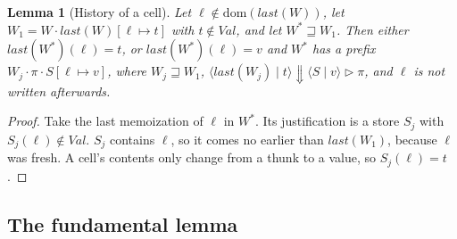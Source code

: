 \documentclass[11pt]{article}
\newtheorem*{lemma}{Lemma}
\newcommand{\last}[1]{\mathit{last}(#1)}
\newcommand{\ext}{\sqsupseteq}
\newcommand{\cfg}[2]{\langle #1 \mid #2 \rangle}
\newcommand{\evals}[5]{\cfg{#1}{#2} \Downarrow \cfg{#3}{#4} \mathrel{\triangleright} #5}
\newcommand{\Val}{\mathit{Val}}
\begin{document}
\begin{lemma}[History of a cell]
  Let $\ell \notin \mathrm{dom}(\last{W})$, let $W_1 = W \cdot
  \last{W}[\ell \mapsto t]$ with $t \notin \Val$, and let $W^* \ext W_1$. Then
  either $\last{W^*}(\ell) = t$, or $\last{W^*}(\ell) = v$ and $W^*$ has a
  prefix $W_j \cdot \pi \cdot S[\ell \mapsto v]$, where $W_j \ext W_1$,
  $\evals{\last{W_j}}{t}{S}{v}{\pi}$, and $\ell$ is not written afterwards.
\end{lemma}
\begin{proof}
  Take the last memoization of $\ell$ in $W^*$. Its justification is a store
  $S_j$ with $S_j(\ell) \notin \Val$. $S_j$ contains $\ell$, so it comes no
  earlier than $\last{W_1}$, because $\ell$ was fresh. A cell's contents only
  change from a thunk to a value, so $S_j(\ell) = t$.
\end{proof}

\subsection{The fundamental lemma}
\end{document}
